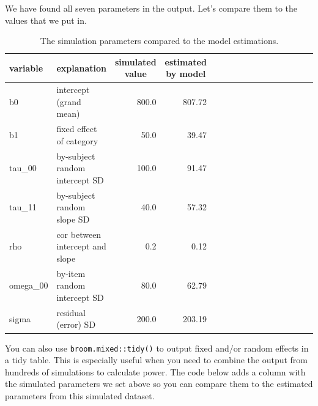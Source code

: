 \documentclass[doc,floatsintext]{apa6}
\newenvironment{Shaded}{\begin{snugshade}}{\end{snugshade}}
\newcommand{\KeywordTok}[1]{\textcolor[rgb]{0.13,0.29,0.53}{\textbf{#1}}}
\newcommand{\DataTypeTok}[1]{\textcolor[rgb]{0.13,0.29,0.53}{#1}}
\newcommand{\DecValTok}[1]{\textcolor[rgb]{0.00,0.00,0.81}{#1}}
\newcommand{\StringTok}[1]{\textcolor[rgb]{0.31,0.60,0.02}{#1}}
\newcommand{\CommentTok}[1]{\textcolor[rgb]{0.56,0.35,0.01}{\textit{#1}}}
\newcommand{\OperatorTok}[1]{\textcolor[rgb]{0.81,0.36,0.00}{\textbf{#1}}}
\newcommand{\NormalTok}[1]{#1}
\begin{document}
We have found all seven parameters in the output. Let's compare them to
the values that we put in.

\begin{table}[H]
\begin{center}
\begin{threeparttable}
\caption{\label{tab:param-compare}The simulation parameters compared to the model estimations.}
\begin{tabular}{llrrllrrllrrllrr}
\toprule
variable & \multicolumn{1}{c}{explanation} & \multicolumn{1}{c}{simulated value} & \multicolumn{1}{c}{estimated by model}\\
\midrule
b0 & intercept (grand mean) & 800.0 & 807.72\\
b1 & fixed effect of category & 50.0 & 39.47\\
tau\_00 & by-subject random intercept SD & 100.0 & 91.47\\
tau\_11 & by-subject random slope SD & 40.0 & 57.32\\
rho & cor between intercept and slope & 0.2 & 0.12\\
omega\_00 & by-item random intercept SD & 80.0 & 62.79\\
sigma & residual (error) SD & 200.0 & 203.19\\
\bottomrule
\end{tabular}
\end{threeparttable}
\end{center}
\end{table}

You can also use \texttt{broom.mixed::tidy()} to output fixed and/or
random effects in a tidy table. This is especially useful when you need
to combine the output from hundreds of simulations to calculate power.
The code below adds a column with the simulated parameters we set above
so you can compare them to the estimated parameters from this simulated
dataset.

\begin{Shaded}
\end{Shaded}
\end{document}
